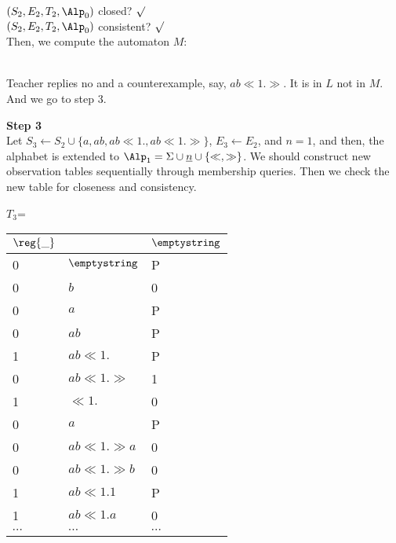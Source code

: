 \begin{minipage}{0.5\textwidth}
  $(S_2,E_2,T_2,{\Alp_0})$ closed? $\surd$ \\
  $(S_2,E_2,T_2,{\Alp_0})$ consistent? $\surd$\\
  Then, we compute the automaton $M$:
  
  \\
  Teacher replies no and a counterexample, say, $ab\ll 1. \gg$. It is in $L$ not in $M$. And we go to step 3.
\end{minipage}
\textbf{Step 3}\\
Let $S_3\leftarrow S_2\cup \{a,ab, ab\ll 1.,ab\ll 1. \gg\}$, $E_3\leftarrow E_2$, and $n=1$, and then, the alphabet is extended to ${\Alp_1}=\Sigma\cup \underline{n}\cup\{\ll,\gg\}$. We should construct new observation tables sequentially through membership queries. Then we check the new table for closeness and consistency.\\
\begin{minipage}{0.5\textwidth}
  \begin{center}
    $T_3$=
    \begin{tabular}{l|l|l}
      
      {$\reg{\_}$}  &{}  &      {$\emptystring$}     \\
      \hline
      {0}  &${\emptystring}$ & {P} \\
      
      {0}  &{$b$} & {0} \\
      {0}  &{$a$} & {P}\\
      {0}  &{$ab$} & {P}\\
      {1}  & {$ab\ll 1.$} & {P} \\
      {0}  &{$ab\ll 1.\gg$} & {1} \\
      \hline
      {1}  &{$\ll 1.$} & {0} \\
      {0}  &{$a$} & {P} \\
      {0}  &{$ab\ll 1.\gg a$} & {0} \\
      {0}  &{$ab\ll 1.\gg b$} & {0} \\
      {1}  &{$ab\ll 1.1$} & {P} \\
      {1}  &{$ab\ll 1.a$} & {0} \\
      {$\cdots$}  &{$\cdots$} & {$\cdots$} \\
    \end{tabular}
  \end{center}
\end{minipage}
